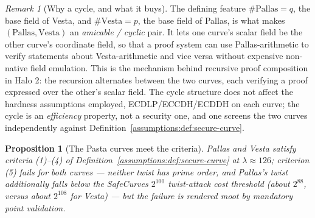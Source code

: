 \documentclass[11pt,a4paper]{article}
\newtheorem{proposition}[theorem]{Proposition}
\theoremstyle{definition}
\theoremstyle{remark}
\newtheorem{remark}[theorem]{Remark}
\begin{document}
\begin{remark}[Why a cycle, and what it buys]
\label{assumptions:rem:cycle}
The defining feature \(\#\mathrm{Pallas} = q\), the base field of Vesta, and \(\#\mathrm{Vesta} = p\), the base field of Pallas, is what makes \((\text{Pallas}, \text{Vesta})\) an \emph{amicable / cyclic} pair. It lets one curve's scalar field be the other curve's coordinate field, so that a proof system can use Pallas-arithmetic to verify statements about Vesta-arithmetic and vice versa without expensive non-native field emulation. This is the mechanism behind recursive proof composition in Halo 2: the recursion alternates between the two curves, each verifying a proof expressed over the other's scalar field. The cycle structure does not affect the hardness assumptions employed, ECDLP/ECCDH/ECDDH on each curve; the cycle is an \emph{efficiency} property, not a security one, and one screens the two curves independently against Definition~\ref{assumptions:def:secure-curve}.
\end{remark}

\begin{proposition}[The Pasta curves meet the criteria]
\label{assumptions:prop:pasta-secure}
Pallas and Vesta satisfy criteria (1)--(4) of Definition~\ref{assumptions:def:secure-curve} at \(\lambda \approx 126\); criterion (5) fails for both curves --- neither twist has prime order, and Pallas's twist additionally falls below the SafeCurves \(2^{100}\) twist-attack cost threshold (about \(2^{88}\), versus about \(2^{108}\) for Vesta) --- but the failure is rendered moot by mandatory point validation.
\end{proposition}
\end{document}
